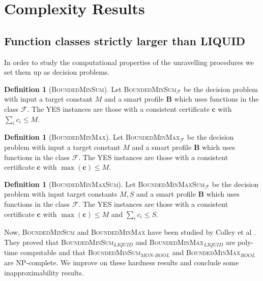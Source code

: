 \documentclass[11pt,a4paper, titlepage]{article}
\theoremstyle{definition}
\newtheorem{definition}[theorem]{Definition}
\let\vec\mathbf
\begin{document}
\newpage



\section{Complexity Results}

\subsection{Function classes strictly larger than LIQUID}

In order to study the computational properties of the unravelling procedures we set them up as decision problems.

\begin{definition}[\textsc{BoundedMinSum}]
    Let \textsc{BoundedMinSum}$_\mathcal{F}$ be the decision problem with input a target constant $M$ and a smart profile $\mathbf{B}$ which uses functions in the class $\mathcal{F}$. 
    The YES instances are those with a consistent certificate  $\vec{c}$ with $\sum_i c_i \leq M$. 
\end{definition}

\begin{definition}[\textsc{BoundedMinMax}]
    Let \textsc{BoundedMinMax}$_\mathcal{F}$ be the decision problem with input a target constant $M$ and a smart profile $\mathbf{B}$ which uses functions in the class $\mathcal{F}$. The YES instances are those with a consistent certificate  $\vec{c}$ with $\max(\vec{c}) \leq M$. 
\end{definition}

\begin{definition}[\textsc{BoundedMinMaxSum}]
    Let \textsc{BoundedMinMaxSum}$_\mathcal{F}$ be the decision problem with input target constants $M, S$ and a smart profile $\mathbf{B}$ which uses functions in the class $\mathcal{F}$. The YES instances are those with a consistent certificate  $\vec{c}$ with $\max (\vec{c}) \leq M$ and $\sum_i c_i \leq S$.
\end{definition}


Now, \textsc{BoundedMinSum} and \textsc{BoundedMinMax} have been studied by Colley et al \cite{grandi}.
They proved that \textsc{BoundedMinSum}$_\mathit{LIQUID}$ and \textsc{BoundedMinMax}$_\mathit{LIQUID}$ are poly-time computable and that \textsc{BoundedMinSum}$_\mathit{MON\text{-}BOOL}$ and \textsc{BoundedMinMax}$_\mathit{BOOL}$ are NP-complete.
We improve on these hardness results and conclude some inapproximability results.
\end{document}
